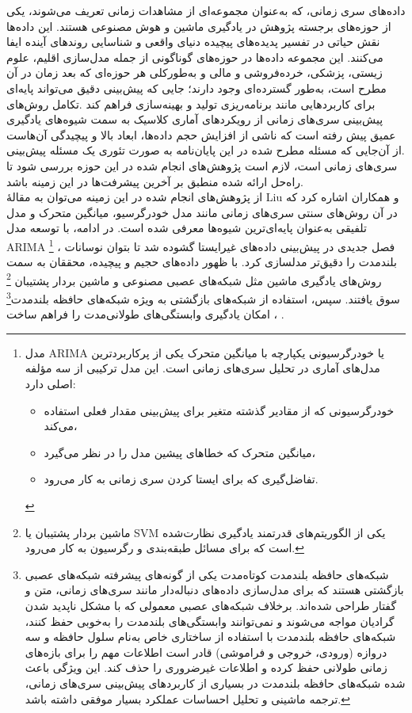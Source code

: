 داده‌های سری زمانی، که به‌عنوان مجموعه‌ای از مشاهدات زمانی تعریف می‌شوند، یکی از حوزه‌های برجسته پژوهش در یادگیری ماشین و هوش مصنوعی هستند. این داده‌ها نقش حیاتی در تفسیر پدیده‌های پیچیده دنیای واقعی و شناسایی روندهای آینده ایفا می‌کنند. این مجموعه داده‌ها در حوزه‌های گوناگونی از جمله مدل‌سازی اقلیم، علوم زیستی، پزشکی، خرده‌فروشی و مالی و به‌طورکلی هر حوزه‌ای که بعد زمان در آن مطرح است، به‌طور گسترده‌ای وجود دارند؛ جایی که پیش‌بینی دقیق می‌تواند پایه‌ای برای کاربردهایی مانند برنامه‌ریزی تولید و بهینه‌سازی فراهم کند .تکامل روش‌های پیش‌بینی سری‌های زمانی از رویکردهای آماری کلاسیک به سمت شیوه‌های یادگیری عمیق پیش رفته است که ناشی از افزایش حجم داده‌ها، ابعاد بالا و پیچیدگی آن‌هاست .از آن‌جایی که مسئله مطرح شده در این پایان‌نامه به صورت تئوری یک مسئله پیش‌بینی سری‌های زمانی است، لازم است پژوهش‌های انجام شده در این حوزه بررسی شود تا راه‌حل ارائه شده منطبق بر آخرین پیشرفت‌ها در این زمینه باشد.
\\
از پژوهش‌های انجام شده در این زمینه می‌توان به مقالۀ Liu و همکاران  اشاره کرد که در آن روش‌های سنتی سری‌های زمانی مانند مدل خودرگرسیو، میانگین متحرک  و مدل تلفیقی به‌عنوان پایه‌‌ای‌ترین شیوه‌ها معرفی شده است. در ادامه، با توسعه مدل ARIMA \footnote{ مدل   ARIMA یا خود‌رگرسیونی یکپارچه با میانگین متحرک یکی از پرکاربردترین مدل‌های آماری در تحلیل سری‌های زمانی است. این مدل ترکیبی از سه مؤلفه اصلی دارد:

\begin{itemize}
   \item خودرگرسیونی  که از مقادیر گذشته متغیر برای پیش‌بینی مقدار فعلی استفاده می‌کند،
   \item میانگین متحرک  که خطاهای پیشین مدل را در نظر می‌گیرد،
   \item تفاضل‌گیری که برای ایستا کردن سری زمانی به کار می‌رود.
\end{itemize}

}  ، فصل جدیدی در پیش‌بینی داده‌های غیرایستا گشوده شد تا بتوان نوسانات بلندمدت را دقیق‌تر مدلسازی کرد. با ظهور داده‌های حجیم و پیچیده، محققان به سمت روش‌های یادگیری ماشین مثل شبکه‌های عصبی مصنوعی و ماشین بردار پشتیبان \footnote{ ماشین بردار پشتیبان یا SVM یکی از الگوریتم‌های قدرتمند یادگیری نظارت‌شده است که برای مسائل طبقه‌بندی و رگرسیون به کار می‌رود.}  سوق یافتند. سپس، استفاده از شبکه‌های بازگشتی به ویژه شبکه‌های حافظه بلندمدت\footnote{شبکه‌های حافظه بلندمدت کوتاه‌مدت یکی از گونه‌های پیشرفته شبکه‌های عصبی بازگشتی هستند که برای مدل‌سازی داده‌های دنباله‌دار مانند سری‌های زمانی، متن و گفتار طراحی شده‌اند. برخلاف شبکه‌های عصبی معمولی که با مشکل ناپدید شدن گرادیان مواجه می‌شوند و نمی‌توانند وابستگی‌های بلندمدت را به‌خوبی حفظ کنند، شبکه‌های حافظه بلندمدت با استفاده از ساختاری خاص به‌نام سلول حافظه و سه دروازه (ورودی، خروجی و فراموشی) قادر است اطلاعات مهم را برای بازه‌های زمانی طولانی حفظ کرده و اطلاعات غیرضروری را حذف کند. این ویژگی باعث شده شبکه‌های حافظه بلندمدت در بسیاری از کاربردهای پیش‌بینی سری‌های زمانی، ترجمه ماشینی و تحلیل احساسات عملکرد بسیار موفقی داشته باشد.}  ، امکان یادگیری وابستگی‌های طولانی‌مدت را فراهم ساخت \cite{liu_forecast_2021}.
